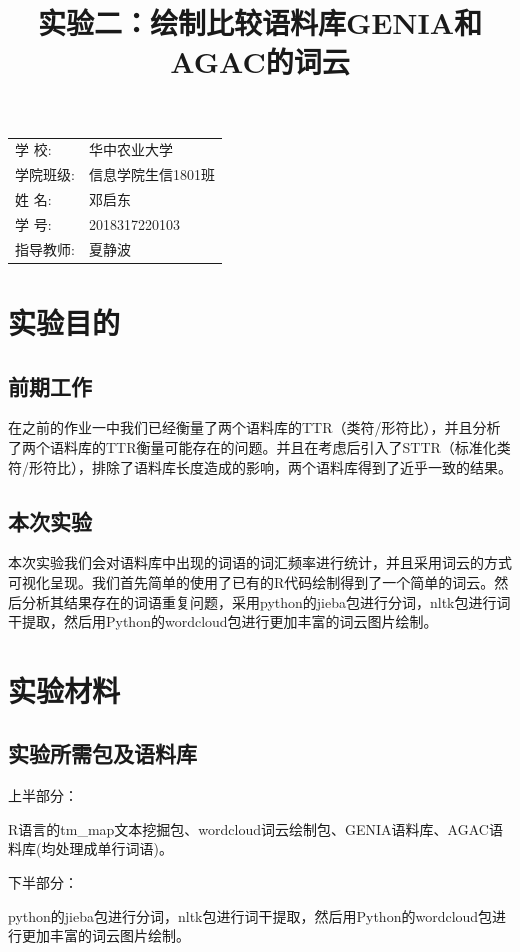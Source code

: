 \documentclass{article}
\title{\heiti 实验二：绘制比较语料库GENIA和AGAC的词云 }
\begin{document}
	\maketitle
	
	\vspace{5cm}
	
	\begin{table}[h]
		\centering
		\begin{Large}
			\begin{tabular}{p{3cm} p{7cm}<{\centering}}
				学  \qquad  校: &  华中农业大学     \\ \cline{2-2}
				学院班级:      & 信息学院生信1801班   \\ \cline{2-2}
				姓  \qquad  名: & 邓启东 \\ \cline{2-2}
				学  \qquad  号: & 2018317220103 \\ \cline{2-2}
				指导教师:       &夏静波 \\ \cline{2-2}
			\end{tabular}
		\end{Large}		
	\end{table}
	
	\newpage%

	\tableofcontents
	
	\newpage
\section{实验目的}
\subsection{前期工作}
在之前的作业一中我们已经衡量了两个语料库的TTR（类符/形符比），并且分析了两个语料库的TTR衡量可能存在的问题。并且在考虑后引入了STTR（标准化类符/形符比），排除了语料库长度造成的影响，两个语料库得到了近乎一致的结果。
\subsection{本次实验}

本次实验我们会对语料库中出现的词语的词汇频率进行统计，并且采用词云的方式可视化呈现。我们首先简单的使用了已有的R代码绘制得到了一个简单的词云。然后分析其结果存在的词语重复问题，采用python的jieba包进行分词，nltk包进行词干提取，然后用Python的wordcloud包进行更加丰富的词云图片绘制。
\section{实验材料}
\subsection{实验所需包及语料库}
上半部分：\par
R语言的tm\_map文本挖掘包、wordcloud词云绘制包、GENIA语料库、AGAC语料库(均处理成单行词语)。\par
下半部分：\par
python的jieba包进行分词，nltk包进行词干提取，然后用Python的wordcloud包进行更加丰富的词云图片绘制。
\end{document}

